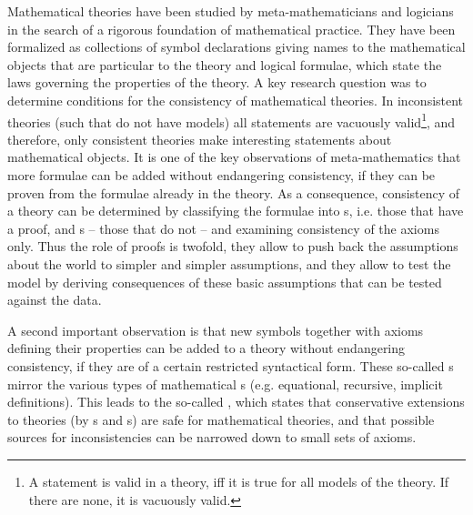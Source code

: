 Mathematical theories {}
have been studied by meta-mathe\-ma\-ti\-cians and logicians in the search of a rigorous
foundation of mathematical practice. They have been formalized as collections of
symbol declarations giving names to the mathematical
objects that are particular to the theory and logical formulae, which state the
laws governing the properties of the theory. A key research question was to
determine conditions for the consistency of mathematical theories. In inconsistent
theories (such that do not have models) all statements are vacuously
valid\footnote{A statement is valid in a theory, iff it is true for all models of
  the theory. If there are none, it is vacuously valid.}, and therefore,
only consistent theories make interesting statements about mathematical objects.
It is one of the key observations of meta-mathematics that more formulae can be
added without endangering consistency, if they can be proven from the formulae
already in the theory. As a consequence, consistency of a theory can be determined
by classifying the formulae into {s}, i.e. those that have a
proof, and {s} -- those that do not -- and examining consistency
of the axioms only.  Thus the role of proofs is twofold, they allow to push back
the assumptions about the world to simpler and simpler assumptions, and they allow
to test the model by deriving consequences of these basic assumptions that can be
tested against the data.
  
A second important observation is that new symbols together with axioms defining
their properties can be added to a theory without endangering consistency, if they
are of a certain restricted syntactical form. These so-called
{s} mirror the various types of mathematical
{s} (e.g. equational, recursive, implicit definitions).  This
leads to the so-called {}, which states that conservative
extensions to theories (by {s} and {s}) are
safe for mathematical theories, and that possible sources for
inconsistencies can be narrowed down to small sets of axioms.

